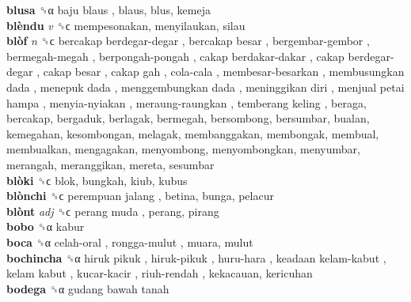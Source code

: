 \textbf{blusa} ␝α   baju blaus , blaus, blus, kemeja  \\
\textbf{blèndu} \emph{v}  ␝ϲ  mempesonakan, menyilaukan, silau  \\
\textbf{blòf} \emph{n}  ␝ϲ   bercakap berdegar-degar ,  bercakap besar ,  bergembar-gembor ,  bermegah-megah ,  berpongah-pongah ,  cakap berdakar-dakar ,  cakap berdegar-degar ,  cakap besar ,  cakap gah ,  cola-cala ,  membesar-besarkan ,  membusungkan dada ,  menepuk dada ,  menggembungkan dada ,  meninggikan diri ,  menjual petai hampa ,  menyia-nyiakan ,  meraung-raungkan ,  temberang keling , beraga, bercakap, bergaduk, berlagak, bermegah, bersombong, bersumbar, bualan, kemegahan, kesombongan, melagak, membanggakan, membongak, membual, membualkan, mengagakan, menyombong, menyombongkan, menyumbar, merangah, meranggikan, mereta, sesumbar  \\
\textbf{blòki} ␝ϲ  blok, bungkah, kiub, kubus  \\
\textbf{blònchi} ␝ϲ   perempuan jalang , betina, bunga, pelacur  \\
\textbf{blònt} \emph{adj}  ␝ϲ   perang muda , perang, pirang  \\
\textbf{bobo} ␝α  kabur  \\
\textbf{boca} ␝α   celah-oral ,  rongga-mulut , muara, mulut  \\
\textbf{bochincha} ␝α   hiruk pikuk ,  hiruk-pikuk ,  huru-hara ,  keadaan kelam-kabut ,  kelam kabut ,  kucar-kacir ,  riuh-rendah , kekacauan, kericuhan  \\
\textbf{bodega} ␝α   gudang bawah tanah   \\
